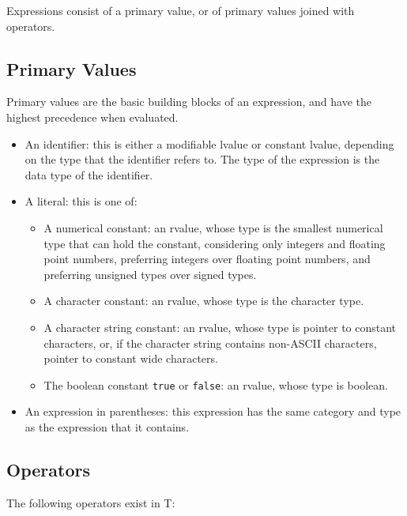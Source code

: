 \documentclass[letterpaper,12pt]{book}
\begin{document}
Expressions consist of a primary value, or of primary values joined with operators.

\subsection{Primary Values}

Primary values are the basic building blocks of an expression, and have the highest precedence when evaluated.

\begin{itemize}
	\item An identifier: this is either a modifiable lvalue or constant lvalue, depending on the type that the identifier refers to. The type of the expression is the data type of the identifier.
	\item A literal: this is one of:
	\begin{itemize}
		\item A numerical constant: an rvalue, whose type is the smallest numerical type that can hold the constant, considering only integers and floating point numbers, preferring integers over floating point numbers, and preferring unsigned types over signed types.
		\item A character constant: an rvalue, whose type is the character type.
		\item A character string constant: an rvalue, whose type is pointer to constant characters, or, if the character string contains non-ASCII characters, pointer to constant wide characters.
		\item The boolean constant \texttt{true} or \texttt{false}: an rvalue, whose type is boolean.
	\end{itemize}
	\item An expression in parentheses: this expression has the same category and type as the expression that it contains.
\end{itemize}

\subsection{Operators}

The following operators exist in T:

\end{document}
